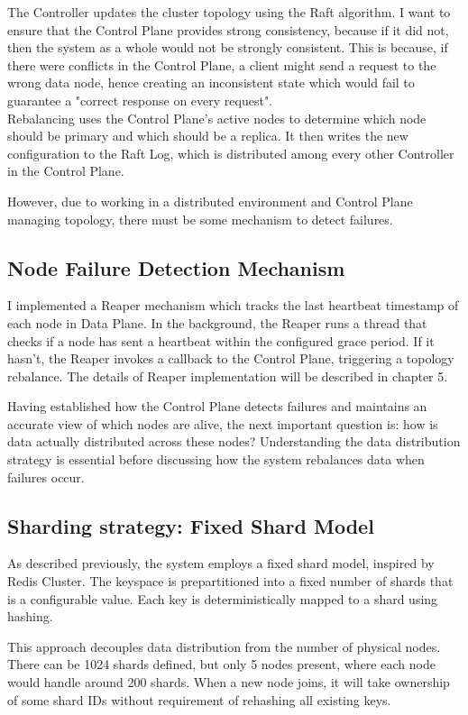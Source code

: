 \documentclass[shortabstract]{iithesis}
\begin{document}
The Controller updates the cluster topology using the Raft algorithm. I want to ensure that the Control Plane provides strong consistency, because if it did not, then the system as a whole would not be strongly consistent. This is because, if there were conflicts in the Control Plane, a client might send a request to the wrong data node, hence creating an inconsistent state which would fail to guarantee a "correct response on every request".\\

Rebalancing uses the Control Plane's active nodes to determine which node should be primary and which should be a replica. It then writes the new configuration to the Raft Log, which is distributed among every other Controller in the Control Plane. 

However, due to working in a distributed environment and Control Plane managing topology, there must be some mechanism to detect failures.

\subsection{Node Failure Detection Mechanism}
I implemented a Reaper mechanism which tracks the last heartbeat timestamp of each node in Data Plane. In the background, the Reaper runs a thread that checks if a node has sent a heartbeat within the configured grace period. If it hasn't, the Reaper invokes a callback to the Control Plane, triggering a topology rebalance. The details of Reaper implementation will be described in chapter 5.

Having established how the Control Plane detects failures and maintains an accurate view of which nodes are alive, the next important question is: how is data actually distributed across these nodes? Understanding the data distribution strategy is essential before discussing how the system rebalances data when failures occur.

\subsection{Sharding strategy: Fixed Shard Model}

As described previously, the system employs a fixed shard model, inspired by Redis Cluster. The keyspace is prepartitioned into a fixed number of shards that is a configurable value. Each key is deterministically mapped to a shard using hashing. 

This approach decouples data distribution from the number of physical nodes. There can be 1024 shards defined, but only 5 nodes present, where each node would handle around 200 shards. When a new node joins, it will take ownership of some shard IDs without requirement of rehashing all existing keys.
\end{document}
